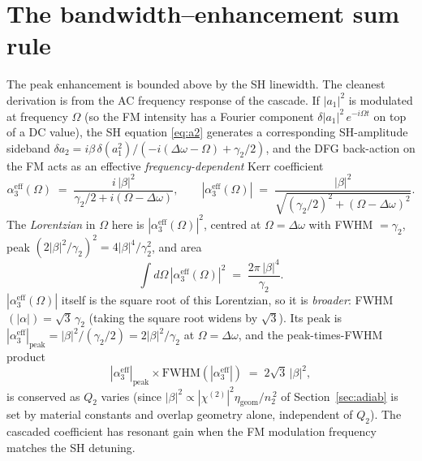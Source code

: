 \documentclass[11pt,a4paper]{article}
\newcommand{\chitwo}{\chi^{(2)}}
\newcommand{\Dom}{\Delta\omega}
\begin{document}
\section{The bandwidth--enhancement sum rule}\label{sec:sumrule}

The peak enhancement is bounded above by the SH linewidth.  The
cleanest derivation is from the AC frequency response of the cascade.
If $|a_1|^{2}$ is modulated at frequency $\Omega$ (so the FM intensity
has a Fourier component $\delta|a_1|^{2}\,e^{-i\Omega t}$ on top of a
DC value), the SH equation \eqref{eq:a2} generates a corresponding
SH-amplitude sideband
$\delta a_2 = i\beta\,\delta(a_1^{2})/(-\!i(\Dom-\Omega)+\gamma_2/2)$,
and the DFG back-action on the FM acts as an effective \emph{frequency-dependent}
Kerr coefficient
\begin{equation}
  \alpha_3^{\text{eff}}(\Omega)
   \;=\;\frac{i\,|\beta|^{2}}{\gamma_2/2+i(\Omega-\Dom)},
  \qquad
  |\alpha_3^{\text{eff}}(\Omega)|
   \;=\;\frac{|\beta|^{2}}{\sqrt{(\gamma_2/2)^{2}+(\Omega-\Dom)^{2}}}.
  \label{eq:alpha3-AC}
\end{equation}
The \emph{Lorentzian} in $\Omega$ here is $|\alpha_3^{\text{eff}}(\Omega)|^{2}$,
centred at $\Omega=\Dom$ with FWHM $=\gamma_2$, peak
$(2|\beta|^{2}/\gamma_2)^{2}=4|\beta|^{4}/\gamma_2^{2}$, and area
\begin{equation}
  \int\!d\Omega\,|\alpha_3^{\text{eff}}(\Omega)|^{2}
   \;=\;\frac{2\pi\,|\beta|^{4}}{\gamma_2}.
  \label{eq:area-rule}
\end{equation}
$|\alpha_3^{\text{eff}}(\Omega)|$ itself is the square root of this
Lorentzian, so it is \emph{broader}: FWHM$(|\alpha|)=\sqrt{3}\,\gamma_2$
(taking the square root widens by $\sqrt{3}$).  Its peak is
$|\alpha_3^{\text{eff}}|_\text{peak}=|\beta|^{2}/(\gamma_2/2)=2|\beta|^{2}/\gamma_2$
at $\Omega=\Dom$, and the peak-times-FWHM product
\begin{equation}
  |\alpha_3^{\text{eff}}|_\text{peak}\times \text{FWHM}(|\alpha_3^{\text{eff}}|)
  \;=\;2\sqrt{3}\,|\beta|^{2},
\end{equation}
is conserved as $Q_2$ varies (since $|\beta|^{2}\propto|\chitwo|^{2}\eta_\text{geom}/n_2^{\,2}$
of Section~\ref{sec:adiab} is set by material constants and overlap
geometry alone, independent of $Q_2$).  The cascaded coefficient has
resonant gain when the FM modulation frequency matches the SH detuning.
\end{document}

